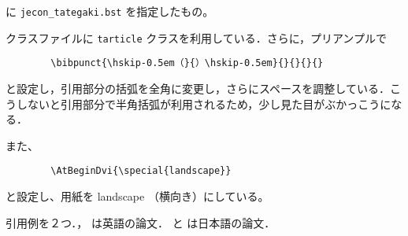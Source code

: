 \documentclass[10pt]{tarticle}
\begin{document}
\verb|| に \verb|jecon_tategaki.bst| を指定したもの。
\vspace*{1em}

クラスファイルに \texttt{tarticle} クラスを利用している．さらに，プリアンプルで
\begin{verbatim}
        \bibpunct{\hskip-0.5em（}{）\hskip-0.5em}{}{}{}{}
\end{verbatim}
と設定し，引用部分の括弧を全角に変更し，さらにスペースを調整している．こ
うしないと引用部分で半角括弧が利用されるため，少し見た目がぶかっこうにな
る．

また、
\begin{verbatim}
        \AtBeginDvi{\special{landscape}}
\end{verbatim}
と設定し、用紙を landscape （横向き）にしている。
\vspace*{2em}

引用例を２つ．\citet{ishikawa03:_green_gas_emiss_contr_open_econom}，
\citet{takeda06:_cge_analy_welfar_effec_trade} は英語の論文．
\citet{oyama99:_mark_stru} と \citet{kuroda97jp:keo} は日本語の論文．

\nocite{*}




% 
\end{document}
